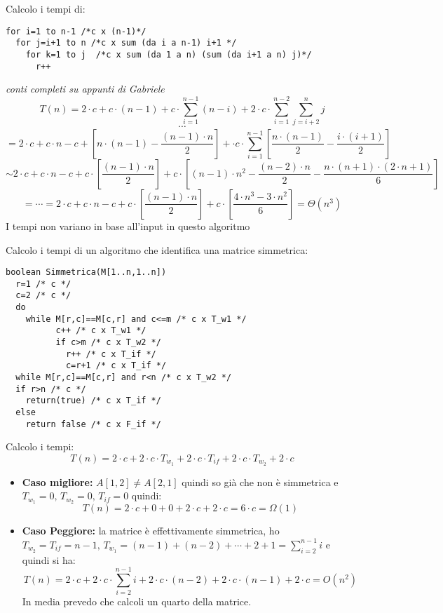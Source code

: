 \documentclass[a4paper,12pt,oneside,tikz]{book}
\begin{document}
\begin{esercizio}
	Calcolo i tempi di:
	\begin{verbatim}
for i=1 to n-1 /*c x (n-1)*/
  for j=i+1 to n /*c x sum (da i a n-1) i+1 */
    for k=1 to j  /*c x sum (da 1 a n) (sum (da i+1 a n) j)*/
      r++
\end{verbatim}
	\textit{conti completi su appunti di Gabriele}
	$$T(n)=2\cdot c +c\cdot (n-1)+c\cdot \sum_{i=1}^{n-1}(n-i)+2\cdot c\cdot \sum_{i=1}^{n-2}\sum_{j=i+2}^{n}j$$
	$$\cdots$$
	$$=2\cdot c+c\cdot n -c +\left[ n\cdot (n-1)-\frac{(n-1)\cdot n}{2}\right]+\cdot c\cdot \sum_{i=1}^{n-1}\left[ \frac{n\cdot(n-1)}{2}-\frac{i\cdot(i+1)}{2} \right]$$
	$$\sim 2\cdot c +c\cdot n-c +c\cdot\left[ \frac{(n-1)\cdot n}{2}\right]+c\cdot\left[ (n-1)\cdot n^2-\frac{(n-2)\cdot n}{2}-\frac{n\cdot (n+1)\cdot (2\cdot n+1)}{6}\right]$$
	$$=\cdots=2\cdot c +c\cdot n-c+c\cdot\left[ \frac{(n-1)\cdot n}{2}\right]+c\cdot\left[\frac{4\cdot n^3-3\cdot n^2}{6}\right]=\Theta(n^3)$$
	I tempi non variano in base all'input in questo algoritmo
\end{esercizio}
\newpage
\begin{esercizio}
	Calcolo i tempi di un algoritmo che identifica una matrice simmetrica:
	\begin{verbatim}
boolean Simmetrica(M[1..n,1..n])
  r=1 /* c */
  c=2 /* c */
  do
    while M[r,c]==M[c,r] and c<=m /* c x T_w1 */
    	  c++ /* c x T_w1 */
    	  if c>m /* c x T_w2 */
    	    r++ /* c x T_if */
    	    c=r+1 /* c x T_if */
  while M[r,c]==M[c,r] and r<n /* c x T_w2 */
  if r>n /* c */
    return(true) /* c x T_if */
  else 
    return false /* c x F_if */
\end{verbatim}
	Calcolo i tempi:
	$$T(n)=2\cdot c + 2\cdot c\cdot T_{w_1}+2\cdot c\cdot T_{if}+2\cdot c\cdot T_{w_2} +2\cdot c$$
	\begin{itemize}
		\item \textbf{Caso migliore:} $A[1,2]\neq A[2,1]$ quindi so già che non è simmetrica e $T_{w_1}=0,\,T_{w_2}=0,\, T_{if}=0$ quindi: $$T(n)=2\cdot c +0+0+2\cdot c+2\cdot c= 6\cdot c=\Omega(1) $$
		\item \textbf{Caso Peggiore:} la matrice è effettivamente simmetrica, ho $T_{w_2}=T_{if}=n-1,\, T_{w_1}=(n-1)+(n-2)+\cdots+2+1=\sum_{i=2}^{n-1}i$ e quindi si ha: $$T(n)=2\cdot c + 2\cdot c\cdot \sum_{i=2}^{n-1}i +2\cdot c\cdot (n-2)+2\cdot c\cdot (n-1)+ 2\cdot c=O(n^2)$$
		      In media prevedo che calcoli un quarto della matrice.
	\end{itemize}
\end{esercizio}
\end{document}
